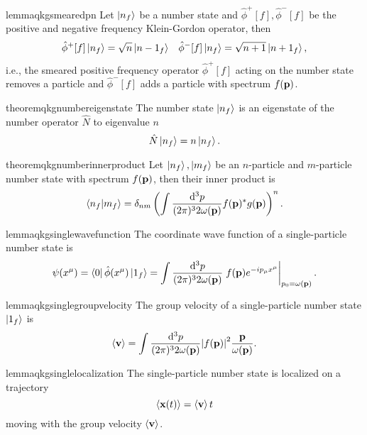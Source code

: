 \begin{restatable}{lemma}{qkgsmearedpn}\label{thm:qkg_smeared_pn}
	Let $\ket{n_f}$ be a number state and $\hat\phi^+[f],\hat\phi^-[f]$ be the positive and negative frequency Klein-Gordon operator, then
	\begin{align}
		\hat\phi^+[f]
		\ket{n_f}
		=
		\sqrt{n}
		\ket{n-1_f}
		&&
		\hat\phi^-[f]
		\ket{n_f}
		=
		\sqrt{n+1}
		\ket{n+1_f}
		,
	\end{align}
	i.e., the smeared positive frequency operator $\hat\phi^+[f]$ acting on the number state removes a particle and $\hat\phi^-[f]$ adds a particle with spectrum $f(\vb{p})$.
\end{restatable}
\begin{restatable}{theorem}{qkgnumbereigenstate}\label{thm:qkg_number_state_eigenstate}
	The number state $\ket{n_f}$ is an eigenstate of the number operator $\hat{N}$ to eigenvalue $n$
	\begin{equation}
		\hat{N}
		\ket{n_f}
		=
		n
		\ket{n_f}
		.
	\end{equation}
\end{restatable}
\begin{restatable}{theorem}{qkgnumberinnerproduct}\label{thm:qkg_number_state_inner_product}
	Let $\ket{n_f},\ket{m_f}$ be an $n$-particle and $m$-particle number state with spectrum $f(\vb{p})$, then their inner product is
	\begin{equation}
		\braket{n_f}{m_f}
		=
		\delta_{nm}
		\left(
			\int\frac{\dd[3]{p}}{(2\pi)^32\omega(\vb{p})}
			f(\vb{p})^*
			g(\vb{p})
		\right)^n
		.
	\end{equation}
\end{restatable}

\begin{restatable}{lemma}{qkgsinglewavefunction}\label{thm:qkg_number_state_single_wave_function}
	The coordinate wave function of a single-particle number state is
	\begin{equation}
		\psi(x^\mu)
		=
		\bra{0}
		\hat\phi(x^\mu)
		\ket{1_f}
		=
		\int\frac{\dd[3]{p}}{(2\pi)^32\omega(\vb{p})}
		\eval{
			f(\vb{p})
			e^{-ip_\mu x^\mu}
		}_{p_0=\omega(\vb{p})}
		.
	\end{equation}
\end{restatable}
\begin{restatable}{lemma}{qkgsinglegroupvelocity}\label{thm:number_state_single_group_velocity}
	The group velocity of a single-particle number state $\ket{1_f}$ is
	\begin{equation}
		\expval{\vb{v}}
		=
		\int\frac{\dd[3]{p}}{(2\pi)^32\omega(\vb{p})}
		\abs{f(\vb{p})}^2
		\frac{\vb{p}}{\omega(\vb{p})}
		\label{eq:single_particle_number_state_group_velocity}
		.
	\end{equation}
\end{restatable}
\begin{restatable}{lemma}{qkgsinglelocalization}
	The single-particle number state is localized on a trajectory
	\begin{equation}
		\expval{\vb{x}(t)}
		=
		\expval{\vb{v}}t
	\end{equation}
	moving with the group velocity $\expval{\vb{v}}$.
\end{restatable}